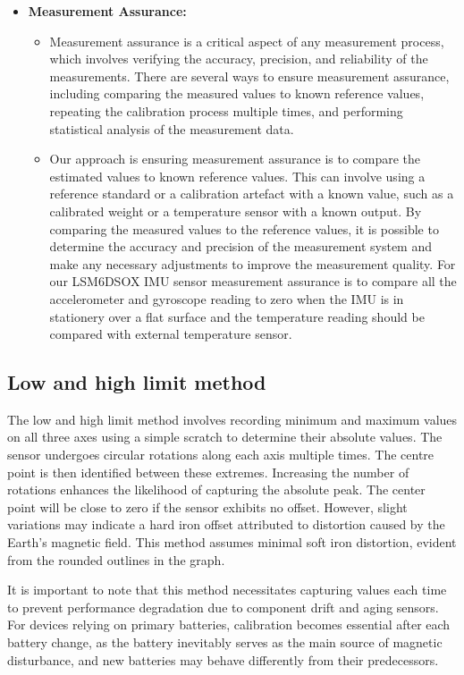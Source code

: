 \begin{itemize}
\item \textbf{Measurement Assurance:}
\begin{itemize}
    \item Measurement assurance is a critical aspect of any measurement process, which involves verifying the accuracy, precision, and reliability of the measurements. There are several ways to ensure measurement assurance, including comparing the measured values to known reference values, repeating the calibration process multiple times, and performing statistical analysis of the measurement data.
    \item Our approach is ensuring measurement assurance is to compare the estimated values to known reference values. This can involve using a reference standard or a calibration artefact with a known value, such as a calibrated weight or a temperature sensor with a known output. By comparing the measured values to the reference values, it is possible to determine the accuracy and precision of the measurement system and make any necessary adjustments to improve the measurement quality. For our LSM6DSOX IMU sensor measurement assurance is to compare all the accelerometer and gyroscope reading to zero when the IMU is in stationery over a flat surface and the temperature reading should be compared with external temperature sensor. 
\end{itemize}

\end{itemize}

\subsection{Low and high limit method}

The low and high limit method involves recording minimum and maximum values on all three axes using a simple scratch to determine their absolute values. The sensor undergoes circular rotations along each axis multiple times\cite{Rehder:2017}. The centre point is then identified between these extremes. Increasing the number of rotations enhances the likelihood of capturing the absolute peak. The center point will be close to zero if the sensor exhibits no offset. However, slight variations may indicate a hard iron offset attributed to distortion caused by the Earth's magnetic field\cite{Rehder:2017}. This method assumes minimal soft iron distortion, evident from the rounded outlines in the graph. 

It is important to note that this method necessitates capturing values each time to prevent performance degradation due to component drift and aging sensors\cite{Rehder:2017}. For devices relying on primary batteries, calibration becomes essential after each battery change, as the battery inevitably serves as the main source of magnetic disturbance, and new batteries may behave differently from their predecessors\cite{Rehder:2017}.


